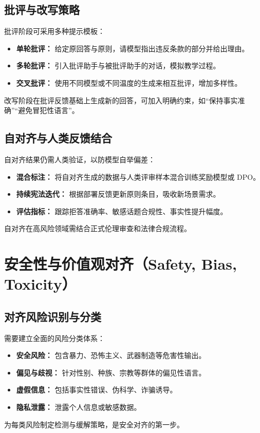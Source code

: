\documentclass[UTF8,zihao=-4]{ctexart}
\begin{document}
\subsection{批评与改写策略}
批评阶段可采用多种提示模板：
\begin{itemize}
  \item \textbf{单轮批评：} 给定原回答与原则，请模型指出违反条款的部分并给出理由。
  \item \textbf{多轮批评：} 引入批评助手与被批评助手的对话，模拟教学过程。
  \item \textbf{交叉批评：} 使用不同模型或不同温度的生成来相互批评，增加多样性。
\end{itemize}
改写阶段在批评反馈基础上生成新的回答，可加入明确约束，如“保持事实准确”“避免冒犯性语言”。

\subsection{自对齐与人类反馈结合}
自对齐结果仍需人类验证，以防模型自举偏差：
\begin{itemize}
  \item \textbf{混合标注：} 将自对齐生成的数据与人类评审样本混合训练奖励模型或 DPO。
  \item \textbf{持续宪法迭代：} 根据部署反馈更新原则条目，吸收新场景需求。
  \item \textbf{评估指标：} 跟踪拒答准确率、敏感话题合规性、事实性提升幅度。
\end{itemize}
自对齐在高风险领域需结合正式伦理审查和法律合规流程。

\section{安全性与价值观对齐（Safety, Bias, Toxicity）}
\subsection{对齐风险识别与分类}
需要建立全面的风险分类体系：
\begin{itemize}
  \item \textbf{安全风险：} 包含暴力、恐怖主义、武器制造等危害性输出。
  \item \textbf{偏见与歧视：} 针对性别、种族、宗教等群体的偏见性语言。
  \item \textbf{虚假信息：} 包括事实性错误、伪科学、诈骗诱导。
  \item \textbf{隐私泄露：} 泄露个人信息或敏感数据。
\end{itemize}
为每类风险制定检测与缓解策略，是安全对齐的第一步。
\end{document}
